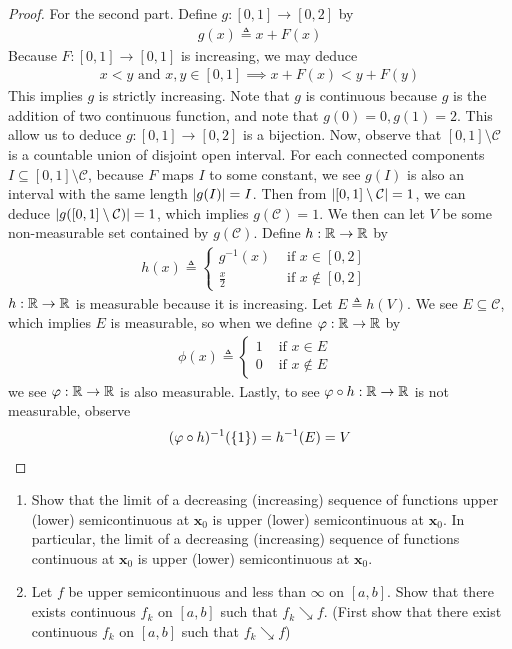 \documentclass{report}
\begin{document}
\begin{proof}
For the second part. Define $g:[0,1]\rightarrow [0,2]$ by 
\begin{align*}
g(x)\triangleq x +F(x)
\end{align*}
Because $F:[0,1]\rightarrow [0,1]$ is increasing, we may deduce 
\begin{align*}
x<y \text{ and }x,y\in [0,1]\implies x+F(x)<y+F(y)
\end{align*}
This implies $g$ is strictly increasing. Note that $g$ is continuous because $g$ is the addition of two continuous function, and note that $g(0)=0,g(1)=2$. This allow us to deduce $g:[0,1]\rightarrow [0,2]$ is a bijection. Now, observe that $[0,1]\setminus \mathcal{C}$ is a countable union of disjoint open interval. For each connected components $I \subseteq [0,1]\setminus \mathcal{C}$, because $F$ maps $I$ to some constant, we see $g(I)$ is also an interval with the same length $\left|g(I)\right|=I$. Then from $\left|[0,1]\setminus \mathcal{C}\right|=1$, we can deduce $\left|g([0,1]\setminus \mathcal{C})\right|=1$, which implies $g(\mathcal{C})=1$. We then can let $V$ be some non-measurable set contained by  $g(\mathcal{C})$. Define $h:\mathbb{R}\rightarrow \mathbb{R}$ by 
\begin{align*}
h(x)\triangleq \begin{cases}
  g^{-1}(x)& \text{ if $x\in [0,2]$ }\\
  \frac{x}{2}& \text{ if $x\not\in [0,2]$ }
\end{cases}
\end{align*}
$h:\mathbb{R}\rightarrow \mathbb{R}$ is measurable because it is increasing. Let $E\triangleq h(V)$. We see $E\subseteq \mathcal{C}$, which implies $E$ is measurable, so when we define $\varphi:\mathbb{R}\rightarrow \mathbb{R}$ by 
\begin{align*}
\phi (x)\triangleq \begin{cases}
  1& \text{ if $x\in E$ }\\
  0& \text{ if $x\not \in E$ }
\end{cases}
\end{align*}
we see $\varphi:\mathbb{R}\rightarrow \mathbb{R}$ is also measurable. Lastly, to see $\varphi \circ h:\mathbb{R}\rightarrow \mathbb{R}$ is not measurable, observe 
\begin{align*}
  (\varphi \circ h)^{-1}(\{ 1 \})=h^{-1}(E)=V
\end{align*}
\end{proof}
\begin{question}{}{}
\begin{enumerate}[label=(\alph*)]
  \item Show that the limit of a decreasing (increasing) sequence of functions upper (lower) semicontinuous at $\textbf{x}_0$ is upper (lower) semicontinuous at $\textbf{x}_0$. In particular, the limit of a decreasing (increasing) sequence of functions continuous at $\textbf{x}_0$ is upper (lower) semicontinuous at $\textbf{x}_0$. 
  \item Let $f$ be upper semicontinuous and less than $\infty$ on $[a,b]$. Show that there exists continuous $f_k$ on  $[a,b]$ such that $f_k\searrow f$.  (First show that there exist continuous $f_k$ on  $[a,b]$ such that $f_k\searrow f$) 
\end{enumerate}
\end{question}
\end{document}
